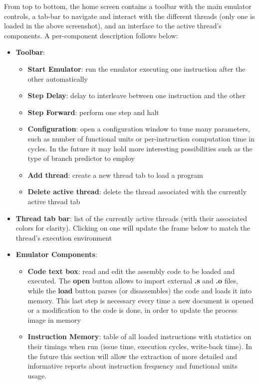 \documentclass[12pt]{article}
\begin{document}
From top to bottom, the home screen contains a toolbar with the main emulator controls, a tab-bar to navigate and interact with the different threads (only one is loaded in the above screenshot), and an interface to the active thread’s components. A per-component description follows below:

\begin{itemize}
    \item \textbf{Toolbar}:
    \begin{itemize}
        \item \textbf{Start Emulator}: run the emulator executing one instruction after the other automatically
        \item \textbf{Step Delay}: delay to interleave between one instruction and the other
        \item \textbf{Step Forward}: perform one step and halt
        \item \textbf{Configuration}: open a configuration window to tune many parameters, such as number of functional units or per-instruction computation time in cycles. In the future it may hold more interesting possibilities such as the type of branch predictor to employ
        \item \textbf{Add thread}: create a new thread tab to load a program
        \item \textbf{Delete active thread}: delete the thread associated with the currently active thread tab
    \end{itemize}
    \item \textbf{Thread tab bar}: list of the currently active threads (with their associated colors for clarity). Clicking on one will update the frame below to match the thread’s execution environment
    \item \textbf{Emulator Components}:
    \begin{itemize}
        \item \textbf{Code text box}: read and edit the assembly code to be loaded and executed. The \textbf{open} button allows to import external \textbf{.s} and \textbf{.o} files, while the \textbf{load} button parses (or disassembles) the code and loads it into memory. This last step is necessary every time a new document is opened or a modification to the code is done, in order to update the process image in memory
        \item \textbf{Instruction Memory}: table of all loaded instructions with statistics on their timings when run (issue time, execution cycles, write-back time). In the future this section will allow the extraction of more detailed and informative reports about instruction frequency and functional units usage.

\end{itemize}
\end{itemize}
\end{document}
